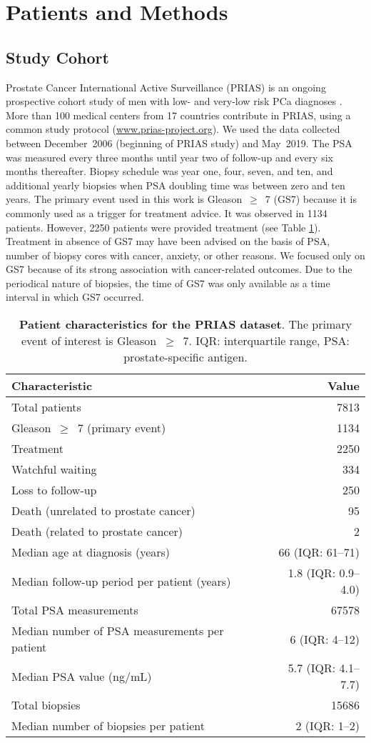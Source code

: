 \section{Patients and Methods}

\subsection{Study Cohort}
Prostate Cancer International Active Surveillance (PRIAS) is an ongoing prospective cohort study of men with low- and very-low risk PCa diagnoses \cite{bul2013active}. More than 100 medical centers from 17 countries contribute in PRIAS, using a common study protocol (\url{www.prias-project.org}). We used the data collected between December~2006 (beginning of PRIAS study) and May~2019. The PSA was measured every three months until year two of follow-up and every six months thereafter. Biopsy schedule was year one, four, seven, and ten, and additional yearly biopsies when PSA doubling time was between zero and ten years. The primary event used in this work is Gleason~$\geq$~7 (GS7) because it is commonly used as a trigger for treatment advice. It was observed in 1134 patients. However, 2250 patients were provided treatment (see Table \ref{table:prias_summary}). Treatment in absence of GS7 may have been advised on the basis of PSA, number of biopsy cores with cancer, anxiety, or other reasons. We focused only on GS7 because of its strong association with cancer-related outcomes. Due to the periodical nature of biopsies, the time of GS7 was only available as a time interval in which GS7 occurred.

\begin{table}
\small\sf\centering
\caption{\textbf{Patient characteristics for the PRIAS dataset}. The primary event of interest is Gleason~$\geq$~7. IQR: interquartile range, PSA: prostate-specific antigen.}
\label{table:prias_summary}
\begin{tabular}{lr}
\hline
\hline
Characteristic & Value\\
\hline
Total patients & 7813\\
Gleason~$\geq$~7 (primary event) & 1134\\
Treatment & 2250\\
Watchful waiting & 334\\
Loss to follow-up & 250\\
Death (unrelated to prostate cancer) & 95\\
Death (related to prostate cancer) & 2\\
\hline
Median age at diagnosis (years) & 66 (IQR: 61--71)\\
Median follow-up period per patient (years) &  1.8 (IQR: 0.9--4.0)\\
Total PSA measurements & 67578\\
Median number of PSA measurements per patient &  6 (IQR: 4--12)\\
Median PSA value (ng/mL) & 5.7 (IQR: 4.1--7.7)\\
Total biopsies & 15686\\
Median number of biopsies per patient &  2 (IQR: 1--2)\\
\hline
\end{tabular}
\end{table}